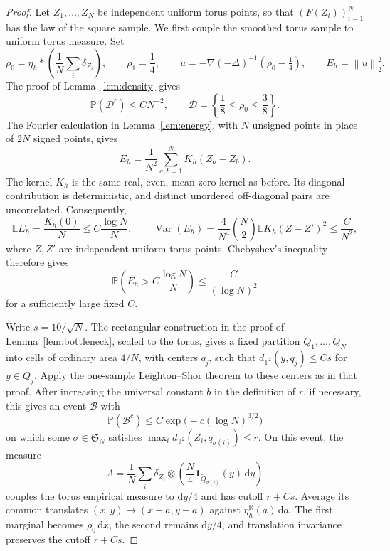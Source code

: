 \documentclass[11pt]{article}
\newcommand{\Pbb}{\mathbb P}
\newcommand{\Ebb}{\mathbb E}
\newcommand{\R}{\mathbb R}
\newcommand{\T}{\mathbb T^2}
\newcommand{\Var}{\operatorname{Var}}
\newcommand{\norm}[1]{\left\lVert #1\right\rVert}
\theoremstyle{remark}
\numberwithin{equation}{section}
\begin{document}
\begin{proof}
Let \(Z_1,\ldots,Z_N\) be independent uniform torus points, so that
\((F(Z_i))_{i=1}^N\) has the law of the square sample. We first
couple the smoothed torus sample to uniform torus measure. Set
\[
 \rho_0=\eta_h*\left(\frac1N\sum_i\delta_{Z_i}\right),
 \qquad \rho_1=\frac14,\qquad
 u=-\nabla(-\Delta)^{-1}(\rho_0-\tfrac14),
 \qquad E_h=\norm u_2^2.
\]
The proof of Lemma~\ref{lem:density} gives
\[
 \Pbb(\mathcal D^c)\le CN^{-2},
 \qquad
 \mathcal D=\left\{\frac18\le\rho_0\le\frac38\right\}.
\]
The Fourier calculation in Lemma~\ref{lem:energy}, with \(N\)
unsigned points in place of \(2N\) signed points, gives
\[
 E_h=\frac1{N^2}\sum_{a,b=1}^N K_h(Z_a-Z_b).
\]
The kernel \(K_h\) is the same real, even, mean-zero kernel as
before. Its diagonal contribution is deterministic, and distinct
unordered off-diagonal pairs are uncorrelated. Consequently,
\[
 \Ebb E_h=\frac{K_h(0)}N\le C\frac{\log N}{N},
 \qquad
 \Var(E_h)=\frac4{N^4}\binom N2
       \Ebb K_h(Z-Z')^2\le\frac C{N^2},
\]
where \(Z,Z'\) are independent uniform torus points. Chebyshev's
inequality therefore gives
\[
 \Pbb\left(E_h>C\frac{\log N}{N}\right)
 \le\frac C{(\log N)^2}
\]
for a sufficiently large fixed \(C\).

Write \(s=10/\sqrt N\). The rectangular construction in the proof
of Lemma~\ref{lem:bottleneck}, scaled to the torus, gives a fixed
partition \(\widetilde Q_1,\ldots,\widetilde Q_N\) into cells of
ordinary area \(4/N\), with centers \(q_j\), such that
\(d_{\T}(y,q_j)\le Cs\) for \(y\in\widetilde Q_j\).
Apply the one-sample Leighton--Shor theorem
\cite[Theorem~4.7.1]{Tal21} to these centers as in that proof.
After increasing the universal constant \(b\) in the definition of
\(r\), if necessary, this gives an event \(\mathcal B\) with
\[
 \Pbb(\mathcal B^c)
 \le C\exp\bigl(-c(\log N)^{3/2}\bigr)
\]
on which some \(\sigma\in\mathfrak S_N\) satisfies
\(\max_i d_{\T}(Z_i,q_{\sigma(i)})\le r\).
On this event, the measure
\[
 \Lambda=\frac1N\sum_i\delta_{Z_i}\otimes
 \left(\frac N4\mathbf1_{\widetilde Q_{\sigma(i)}}(y)
       \,\mathrm dy\right)
\]
couples the torus empirical measure to \(\mathrm dy/4\) and has
cutoff \(r+Cs\). Average its common translates
\((x,y)\mapsto(x+a,y+a)\) against
\(\eta_h^{\R}(a)\,\mathrm da\). The first marginal becomes
\(\rho_0\,\mathrm dx\), the second remains \(\mathrm dy/4\),
and translation invariance preserves the cutoff \(r+Cs\).


\end{proof}
\end{document}
